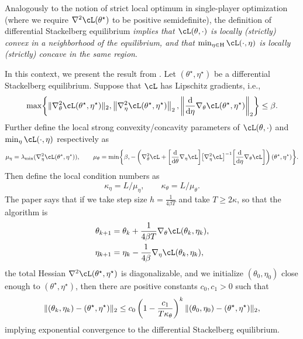 \documentclass[../../book-main.tex]{subfiles}
\begin{document}
Analogously to the notion of strict local optimum in single-player optimization (where we require \(\nabla^{2}\cL(\theta^{\star})\) to be positive semidefinite), the definition of differential Stackelberg equilibrium \textit{implies that \(\cL(\theta, \cdot)\) is locally (strictly) convex in a neighborhood of the equilibrium, and that \(\min_{\eta \in \Eta}\cL(\cdot, \eta)\) is locally (strictly) concave in the same region}.

In this context, we present the result from \cite{li2022convergence}. Let \((\theta^{\star}, \eta^{\star})\) be a differential Stackelberg equilibrium. Suppose that \(\cL\) has Lipschitz gradients, i.e.,
\begin{equation}
    \max\rc{\norm{\nabla_{\theta}^{2}\cL(\theta^{\star}, \eta^{\star})}_{2}, \norm*{\nabla_{\eta}^{2}\cL(\theta^{\star}, \eta^{\star})}_{2},  \norm*{\odv*{\nabla_{\theta}\cL(\theta^{\star}, \eta^{\star})}{\eta}}_{2}} \leq \beta.
\end{equation}
Further define the local strong convexity/concavity parameters of \(\cL(\theta, \cdot)\) and \(\min_{\eta}\cL(\cdot, \eta)\) respectively as
\begin{equation}
    \mu_{\eta} = \lambda_{\min}(\nabla_{\eta}^{2}\cL(\theta^{\star}, \eta^{\star})), \qquad \mu_{\theta} = \min\rc{\beta, -\bp{\nabla_{\theta}^{2}\cL + \rs{\odv*{\nabla_{\eta}\cL}{\theta}}\rs{\nabla_{\eta}^{2}\cL}^{-1}\rs{\odv*{\nabla_{\theta}\cL}{\eta}}}(\theta^{\star}, \eta^{\star})}.
\end{equation}
Then define the local condition numbers as 
\begin{equation}
    \kappa_{\eta} = L/\mu_{\eta}, \qquad \kappa_{\theta} = L/\mu_{\theta}.
\end{equation}
The paper \cite{li2022convergence} says that if we take step size \(h = \frac{1}{4\beta T}\) and take \(T \geq 2\kappa\), so that the algorithm is 
\begin{align}
    \theta_{k + 1}
    &= \theta_{k} + \frac{1}{4\beta T}\nabla_{\theta} \cL(\theta_{k}, \eta_{k}), \\
    \eta_{k + 1}
    &= \eta_{k} - \frac{1}{4\beta}\nabla_{\eta} \cL(\theta_{k}, \eta_{k}),
\end{align}
the total Hessian \(\nabla^{2}\cL(\theta^{\star}, \eta^{\star})\) is diagonalizable, and we initialize \((\theta_{0}, \eta_{0})\) close enough to \((\theta^{\star}, \eta^{\star})\), then there are positive constants \(c_{0}, c_{1} > 0\) such that 
\begin{equation}
    \norm{(\theta_{k}, \eta_{k}) - (\theta^{\star}, \eta^{\star})}_{2} \leq c_{0}\bp{1 - \frac{c_{1}}{T\kappa_{\theta}}}^{k}\norm{(\theta_{0}, \eta_{0}) - (\theta^{\star}, \eta^{\star})}_{2},
\end{equation}
implying exponential convergence to the differential Stackelberg equilibrium.
\end{document}
